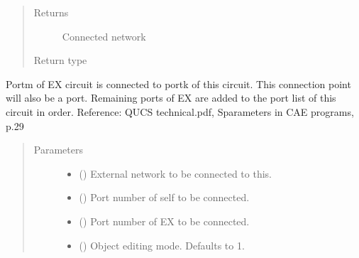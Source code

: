 \documentclass[letterpaper,10pt,english]{sphinxmanual}
\begin{document}
\begin{fulllineitems}
\begin{fulllineitems}
\begin{quote}
\begin{description}
\item[{Returns}] \leavevmode
Connected network

\item[{Return type}] \leavevmode
{\hyperref[\detokenize{touchstone:touchstone.spfile}]{}}

\end{description}\end{quote}

\end{fulllineitems}


\begin{fulllineitems}
\label{\detokenize{touchstone:touchstone.spfile.connect_network_1_conn_retain}}
Port\sphinxhyphen{}m of EX circuit is connected to port\sphinxhyphen{}k of this circuit. This connection point will also be a port.
Remaining ports of EX are added to the port list of this circuit in order.
Reference: QUCS technical.pdf, S\sphinxhyphen{}parameters in CAE programs, p.29
\begin{quote}\begin{description}
\item[{Parameters}] \leavevmode\begin{itemize}
\item {} 
 ({\hyperref[\detokenize{touchstone:touchstone.spfile}]{}}) \textendash{} External network to be connected to this.

\item {} 
 () \textendash{} Port number of self to be connected.

\item {} 
 () \textendash{} Port number of EX to be connected.

\item {} 
 (\sphinxstyleliteralemphasis{\sphinxupquote{, }}) \textendash{} Object editing mode. Defaults to \sphinxhyphen{}1.


\end{itemize}
\end{description}
\end{quote}
\end{fulllineitems}
\end{fulllineitems}
\end{document}
